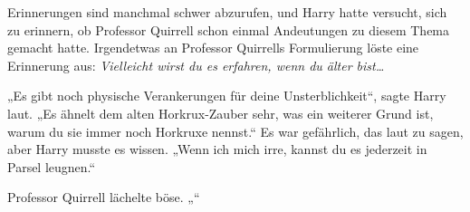 Erinnerungen sind manchmal schwer abzurufen, und Harry hatte versucht, sich zu erinnern, ob Professor Quirrell schon einmal Andeutungen zu diesem Thema gemacht hatte. Irgendetwas an Professor Quirrells Formulierung löste eine Erinnerung aus:
\emph{Vielleicht wirst du es erfahren, wenn du älter bist…}

„Es gibt noch physische Verankerungen für deine Unsterblichkeit“, sagte Harry laut. „Es ähnelt dem alten Horkrux-Zauber sehr, was ein weiterer Grund ist, warum du sie immer noch Horkruxe nennst.“
Es war gefährlich, das laut zu sagen, aber Harry musste es wissen.
„Wenn ich mich irre, kannst du es jederzeit in Parsel leugnen.“

Professor Quirrell lächelte böse.
„“

